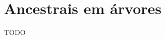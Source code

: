 \documentclass[main.tex]{subfiles}
\begin{document}
\chapter{Ancestrais em árvores} \label{cap:ancestrais}
TODO
\end{document}
